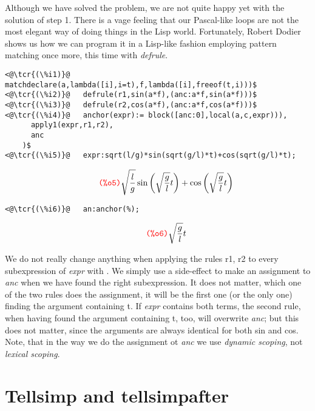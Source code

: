 \documentclass[../Maxima_Workbook.tex]{subfiles}
\begin{document}
Although we have solved the problem, we are not quite happy yet with the solution of step 1. There is a vage feeling that our Pascal-like loops are not the most elegant way of doing things in the Lisp world. Fortunately, Robert Dodier shows us how we can program it in a Lisp-like fashion employing pattern matching once more, this time with \emph{defrule}.

\lz \begin{small}
\color{blue} \leqn
\begin{lstlisting}
<@\tcr{(\%i1)}@   matchdeclare(a,lambda([i],i=t),f,lambda([i],freeof(t,i)))$
<@\tcr{(\%i2)}@   defrule(r1,sin(a*f),(anc:a*f,sin(a*f)))$
<@\tcr{(\%i3)}@   defrule(r2,cos(a*f),(anc:a*f,cos(a*f)))$
<@\tcr{(\%i4)}@   anchor(expr):= block([anc:0],local(a,c,expr))),
	  apply1(expr,r1,r2),
	  anc
	)$
<@\tcr{(\%i5)}@   expr:sqrt(l/g)*sin(sqrt(g/l)*t)+cos(sqrt(g/l)*t);
\end{lstlisting}
\vspace{-4mm} \[\tag*{\tcr{\ttfamily (\%o5)}} \sqrt{\frac{l}{g}} \sin{\left( \sqrt{\frac{g}{l}} t\right) }+\cos{\left( \sqrt{\frac{g}{l}} t\right) } \]
\vspace{-6mm} \begin{lstlisting}
<@\tcr{(\%i6)}@   an:anchor(%);
\end{lstlisting}
\vspace{-5mm} \[\tag*{\tcr{\ttfamily (\%o6)}} \sqrt{\frac{g}{l}} t \]
\color{black} \reqn
\end{small} \vspace{-4mm}

\lz We do not really change anything when applying the rules r1, r2 to every subexpression of \emph{expr} with . We simply use a side-effect to make an assignment to \emph{anc} when we have found the right subexpression. It does not matter, which one of the two rules does the assignment, it will be the first one (or the only one) finding the argument containing t. If \emph{expr} contains both terms, the second rule, when having found the argument containing t, too, will overwrite \emph{anc}; but this does not matter, since the arguments are always identical for both sin and cos. Note, that in the way we do the assignment ot \emph{anc} we use \emph{dynamic scoping}, not \emph{lexical scoping}.

\section{Tellsimp and tellsimpafter}
\end{document}
